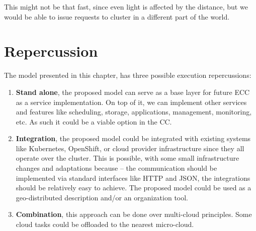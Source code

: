 This might not be that fast, since even light is affected by the distance, but we would be able to issue requests to cluster in a different part of the world.
%
%
\section{Repercussion}\label{sec:repercussion}
%
The model presented in this chapter, has three possible execution repercussions:

\begin{enumerate}[start=1,label={(\bfseries \arabic*)}]
	\item \textbf{Stand alone}, the proposed model can serve as a base layer for future ECC as a service implementation. On top of it, we can implement other services and features like scheduling, storage, applications, management, monitoring, etc. As such it could be a viable option in the CC.
	\item \textbf{Integration}, the proposed model could be integrated with existing systems like Kubernetes, OpenShift, or cloud provider infrastructure since they all operate over the cluster. This is possible, with some small infrastructure changes and adaptations because -- the communication should be implemented via standard interfaces like HTTP and JSON, the integrations should be relatively easy to achieve. The proposed model could be used as a geo-distributed description and/or an organization tool.
	\item \textbf{Combination}, this approach can be done over multi-cloud principles. Some cloud tasks could be offloaded to the nearest micro-cloud.
\end{enumerate} 
%
%
